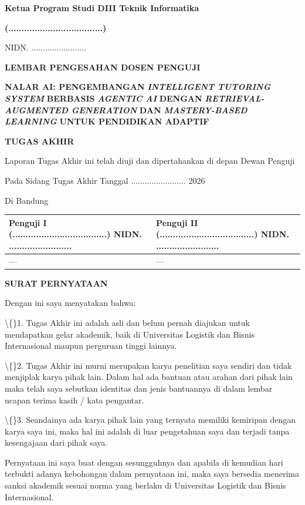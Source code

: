 \documentclass[12pt,a4paper]{article}
\begin{document}
\textbf{Ketua Program Studi DIII Teknik Informatika}

\textbf{(....................................)}

NIDN. ........................

\newpage
\textbf{LEMBAR PENGESAHAN DOSEN PENGUJI}

\textbf{NALAR AI: PENGEMBANGAN} \textbf{\textit{INTELLIGENT TUTORING SYSTEM}} \textbf{BERBASIS} \textbf{\textit{AGENTIC AI}} \textbf{DENGAN} \textbf{\textit{RETRIEVAL-AUGMENTED GENERATION}} \textbf{DAN} \textbf{\textit{MASTERY-BASED LEARNING}} \textbf{UNTUK PENDIDIKAN ADAPTIF}

\textbf{TUGAS AKHIR}

Laporan Tugas Akhir ini telah diuji dan dipertahankan di depan Dewan Penguji

Pada Sidang Tugas Akhir Tanggal ........................ 2026

Di Bandung

\begin{table}[h]
\centering
\begin{tabular}{ll}
\toprule
Penguji I (....................................) NIDN. ........................ & Penguji II (....................................) NIDN. ........................ \\
\midrule
--- & --- \\
\bottomrule
\end{tabular}
\end{table}
\newpage
\textbf{SURAT PERNYATAAN}

Dengan ini saya menyatakan bahwa:

\textbackslash\{\}1.	Tugas Akhir ini adalah asli dan belum pernah diajukan untuk mendapatkan gelar akademik, baik di Universitas Logistik dan Bisnis Internasional maupun perguruan tinggi lainnya.

\textbackslash\{\}2.	Tugas Akhir ini murni merupakan karya penelitian saya sendiri dan tidak menjiplak karya pihak lain. Dalam hal ada bantuan atau arahan dari pihak lain maka telah saya sebutkan identitas dan jenis bantuannya di dalam lembar ucapan terima kasih / kata pengantar.

\textbackslash\{\}3.	Seandainya ada karya pihak lain yang ternyata memiliki kemiripan dengan karya saya ini, maka hal ini adalah di luar pengetahuan saya dan terjadi tanpa kesengajaan dari pihak saya.

Pernyataan ini saya buat dengan sesungguhnya dan apabila di kemudian hari terbukti adanya kebohongan dalam pernyataan ini, maka saya bersedia menerima sanksi akademik sesuai norma yang berlaku di Universitas Logistik dan Bisnis Internasional.
\end{document}
